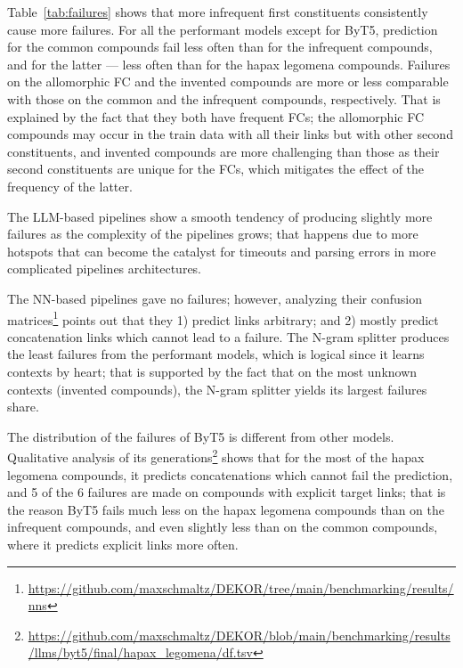\documentclass[11pt]{article}
\begin{document}
Table~\ref{tab:failures} shows that more infrequent first constituents consistently cause more failures. For all the performant models except for ByT5, prediction for the common compounds fail less often than for the infrequent compounds, and for the latter --- less often than for the hapax legomena compounds. Failures on the allomorphic FC and the invented compounds are more or less comparable with those on the common and the infrequent compounds, respectively. That is explained by the fact that they both have frequent FCs; the allomorphic FC compounds may occur in the train data with all their links but with other second constituents, and invented compounds are more challenging than those as their second constituents are unique for the FCs, which mitigates the effect of the frequency of the latter.

The LLM-based pipelines show a smooth tendency of producing slightly more failures as the complexity of the pipelines grows; that happens due to more hotspots that can become the catalyst for timeouts and parsing errors in more complicated pipelines architectures.

The NN-based pipelines gave no failures; however, analyzing their confusion matrices\footnote{\url{https://github.com/maxschmaltz/DEKOR/tree/main/benchmarking/results/nns}} points out that they 1) predict links arbitrary; and 2) mostly predict concatenation links which cannot lead to a failure. The N-gram splitter produces the least failures from the performant models, which is logical since it learns contexts by heart; that is supported by the fact that on the most unknown contexts (invented compounds), the N-gram splitter yields its largest failures share.

The distribution of the failures of ByT5 is different from other models. Qualitative analysis of its generations\footnote{\url{https://github.com/maxschmaltz/DEKOR/blob/main/benchmarking/results/llms/byt5/final/hapax_legomena/df.tsv}} shows that for the most of the hapax legomena compounds, it predicts concatenations which cannot fail the prediction, and 5 of the 6 failures are made on compounds with explicit target links; that is the reason ByT5 fails much less on the hapax legomena compounds than on the infrequent compounds, and even slightly less than on the common compounds, where it predicts explicit links more often.
\end{document}
